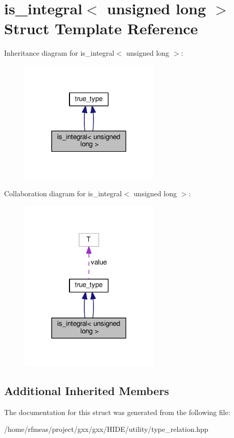 \hypertarget{structis__integral_3_01unsigned_01long_01_4}{}\section{is\+\_\+integral$<$ unsigned long $>$ Struct Template Reference}
\label{structis__integral_3_01unsigned_01long_01_4}


Inheritance diagram for is\+\_\+integral$<$ unsigned long $>$\+:
\nopagebreak
\begin{figure}[H]
\begin{center}
\leavevmode
\includegraphics[width=189pt]{structis__integral_3_01unsigned_01long_01_4__inherit__graph}
\end{center}
\end{figure}


Collaboration diagram for is\+\_\+integral$<$ unsigned long $>$\+:
\nopagebreak
\begin{figure}[H]
\begin{center}
\leavevmode
\includegraphics[width=189pt]{structis__integral_3_01unsigned_01long_01_4__coll__graph}
\end{center}
\end{figure}
\subsection*{Additional Inherited Members}


The documentation for this struct was generated from the following file\+:\begin{DoxyCompactItemize}
\item 
/home/rfmeas/project/gxx/gxx/\+H\+I\+D\+E/utility/type\+\_\+relation.\+hpp\end{DoxyCompactItemize}
